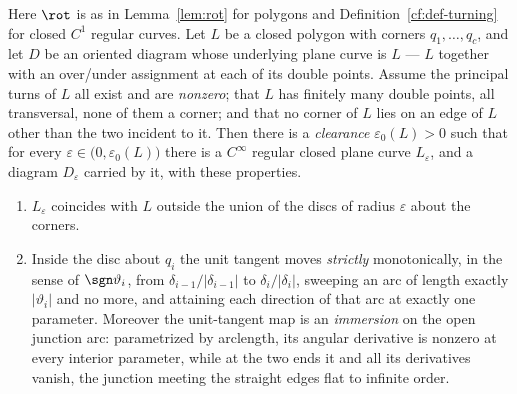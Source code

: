 \begin{lemma}[rounding]\label{cf:lem-rounding}\leanok
Here $\rot$ is as in Lemma~\ref{lem:rot} for polygons and
Definition~\ref{cf:def-turning} for closed $C^1$ regular curves.
Let $L$ be a closed polygon with corners $q_1,\dots,q_c$, and let $D$ be an
oriented diagram whose underlying plane curve is $L$ --- $L$ together with an
over/under assignment at each of its double points. Assume the principal turns
of $L$ all exist and are \emph{nonzero}; that $L$ has finitely many double
points, all transversal, none of them a corner; and that no corner of $L$ lies
on an edge of $L$ other than the two incident to it. Then there is a \emph{clearance} $\varepsilon_0(L)>0$ such that for every
$\varepsilon\in\bigl(0,\varepsilon_0(L)\bigr)$ there is a $C^\infty$ regular
closed plane curve $L_\varepsilon$, and a diagram $D_\varepsilon$ carried by it, with
these properties.
\begin{enumerate}
\item[(a)] $L_\varepsilon$ coincides with $L$ outside the union of the discs of
radius $\varepsilon$ about the corners.
\item[(b)] Inside the disc about $q_i$ the unit tangent moves \emph{strictly}
monotonically, in the sense of $\sgn\vartheta_i$, from $\delta_{i-1}/|\delta_{i-1}|$
to $\delta_i/|\delta_i|$, sweeping an arc of length exactly $|\vartheta_i|$ and no
more, and attaining each direction of that arc at exactly one parameter.
Moreover the unit-tangent map is an \emph{immersion} on the open junction arc:
parametrized by arclength, its angular derivative is nonzero at every interior
parameter, while at the two ends it and all its derivatives vanish, the
junction meeting the straight edges flat to infinite order.


\end{enumerate}
\end{lemma}
